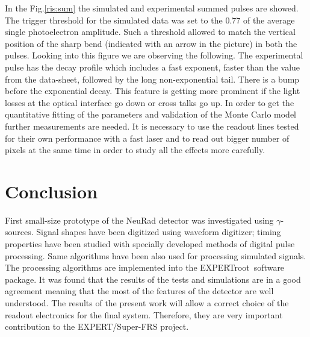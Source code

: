 \documentclass{webofc}
\newcommand{\er}{\textmd{EXPERTroot}}
\begin{document}
In the Fig.\ref{ris:sum} the simulated and experimental summed pulses are showed. The trigger threshold for the simulated data was set to the 0.77 of the average single photoelectron amplitude.
Such a threshold allowed to match the vertical position of the sharp bend (indicated with an arrow in the picture) in both the pulses. Looking into this figure we are observing the following. The experimental pulse has  the decay profile which includes a fast exponent, faster than the value from the data-sheet, followed by the long non-exponential tail. There is a bump before the exponential decay. This feature is getting more prominent if the light losses at the optical interface go down or cross talks go up.  In order to get the quantitative fitting of the parameters and validation of the Monte Carlo model further measurements are needed. It is necessary to use the readout lines tested for their own performance with a fast laser and to read out bigger number of pixels at the same time in order to study all the effects more carefully.

\section{Conclusion}
	
	First small-size prototype of the NeuRad detector was investigated using $\gamma$-sources. Signal shapes have been digitized using 
	waveform digitizer; timing properties have been studied with specially developed methods of digital pulse processing. Same algorithms have been also used for processing simulated signals. The processing algorithms are implemented into the \er\, software package. It was found that the results of the tests and simulations are in a good agreement meaning that the most of the features of the detector are well understood. The results of the present work will allow a correct choice of the readout electronics for the final system. Therefore, they are very important contribution to the EXPERT/Super-FRS project.
	
	
	
	
	
\end{document}
